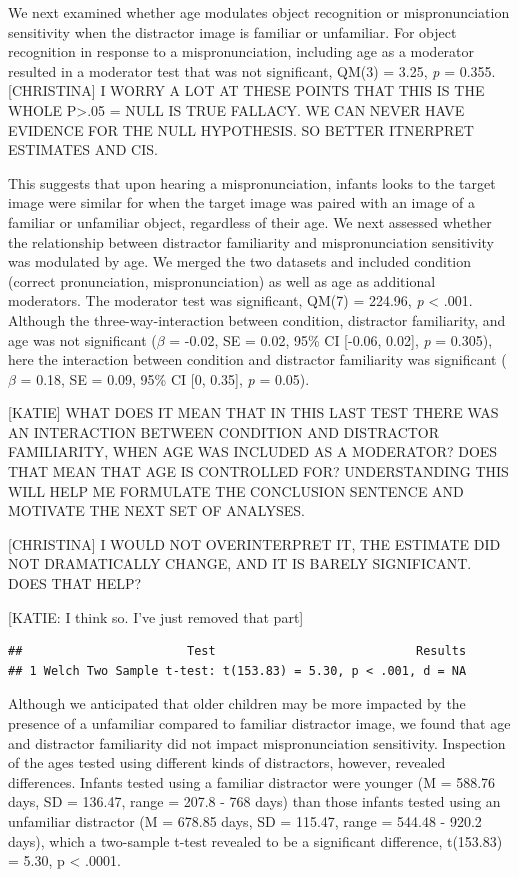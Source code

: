 \documentclass[man]{apa6}
\theoremstyle{definition}
\theoremstyle{definition}
\theoremstyle{definition}
\theoremstyle{remark}
\begin{document}
We next examined whether age modulates object recognition or
mispronunciation sensitivity when the distractor image is familiar or
unfamiliar. For object recognition in response to a mispronunciation,
including age as a moderator resulted in a moderator test that was not
significant, QM(3) = 3.25, \emph{p} = 0.355. {[}CHRISTINA{]} I WORRY A
LOT AT THESE POINTS THAT THIS IS THE WHOLE P\textgreater{}.05 = NULL IS
TRUE FALLACY. WE CAN NEVER HAVE EVIDENCE FOR THE NULL HYPOTHESIS. SO
BETTER ITNERPRET ESTIMATES AND CIS.

This suggests that upon hearing a mispronunciation, infants looks to the
target image were similar for when the target image was paired with an
image of a familiar or unfamiliar object, regardless of their age. We
next assessed whether the relationship between distractor familiarity
and mispronunciation sensitivity was modulated by age. We merged the two
datasets and included condition (correct pronunciation,
mispronunciation) as well as age as additional moderators. The moderator
test was significant, QM(7) = 224.96, \emph{p} \textless{} .001.
Although the three-way-interaction between condition, distractor
familiarity, and age was not significant (\(\beta\) = -0.02, SE = 0.02,
95\% CI {[}-0.06, 0.02{]}, \emph{p} = 0.305), here the interaction
between condition and distractor familiarity was significant (\(\beta\)
= 0.18, SE = 0.09, 95\% CI {[}0, 0.35{]}, \emph{p} = 0.05).

{[}KATIE{]} WHAT DOES IT MEAN THAT IN THIS LAST TEST THERE WAS AN
INTERACTION BETWEEN CONDITION AND DISTRACTOR FAMILIARITY, WHEN AGE WAS
INCLUDED AS A MODERATOR? DOES THAT MEAN THAT AGE IS CONTROLLED FOR?
UNDERSTANDING THIS WILL HELP ME FORMULATE THE CONCLUSION SENTENCE AND
MOTIVATE THE NEXT SET OF ANALYSES.

{[}CHRISTINA{]} I WOULD NOT OVERINTERPRET IT, THE ESTIMATE DID NOT
DRAMATICALLY CHANGE, AND IT IS BARELY SIGNIFICANT. DOES THAT HELP?

{[}KATIE: I think so. I've just removed that part{]}

\begin{verbatim}
##                       Test                            Results
## 1 Welch Two Sample t-test: t(153.83) = 5.30, p < .001, d = NA
\end{verbatim}

Although we anticipated that older children may be more impacted by the
presence of a unfamiliar compared to familiar distractor image, we found
that age and distractor familiarity did not impact mispronunciation
sensitivity. Inspection of the ages tested using different kinds of
distractors, however, revealed differences. Infants tested using a
familiar distractor were younger (M = 588.76 days, SD = 136.47, range =
207.8 - 768 days) than those infants tested using an unfamiliar
distractor (M = 678.85 days, SD = 115.47, range = 544.48 - 920.2 days),
which a two-sample t-test revealed to be a significant difference,
t(153.83) = 5.30, p \textless{} .0001.
\end{document}

